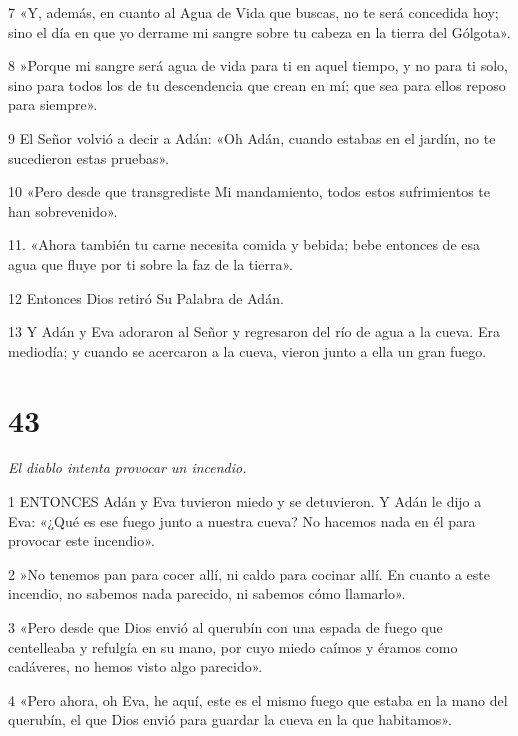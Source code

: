 \par 7 «Y, además, en cuanto al Agua de Vida que buscas, no te será concedida hoy; sino el día en que yo derrame mi sangre sobre tu cabeza en la tierra del Gólgota».

\par 8 »Porque mi sangre será agua de vida para ti en aquel tiempo, y no para ti solo, sino para todos los de tu descendencia que crean en mí; que sea para ellos reposo para siempre».

\par 9 El Señor volvió a decir a Adán: «Oh Adán, cuando estabas en el jardín, no te sucedieron estas pruebas».

\par 10 «Pero desde que transgrediste Mi mandamiento, todos estos sufrimientos te han sobrevenido».

11. «Ahora también tu carne necesita comida y bebida; bebe entonces de esa agua que fluye por ti sobre la faz de la tierra».

\par 12 Entonces Dios retiró Su Palabra de Adán.

\par 13 Y Adán y Eva adoraron al Señor y regresaron del río de agua a la cueva. Era mediodía; y cuando se acercaron a la cueva, vieron junto a ella un gran fuego.

\chapter{43}

\par \textit{El diablo intenta provocar un incendio.}

\par 1 ENTONCES Adán y Eva tuvieron miedo y se detuvieron. Y Adán le dijo a Eva: «¿Qué es ese fuego junto a nuestra cueva? No hacemos nada en él para provocar este incendio».

\par 2 »No tenemos pan para cocer allí, ni caldo para cocinar allí. En cuanto a este incendio, no sabemos nada parecido, ni sabemos cómo llamarlo».

\par 3 «Pero desde que Dios envió al querubín con una espada de fuego que centelleaba y refulgía en su mano, por cuyo miedo caímos y éramos como cadáveres, no hemos visto algo parecido».

\par 4 «Pero ahora, oh Eva, he aquí, este es el mismo fuego que estaba en la mano del querubín, el que Dios envió para guardar la cueva en la que habitamos».

